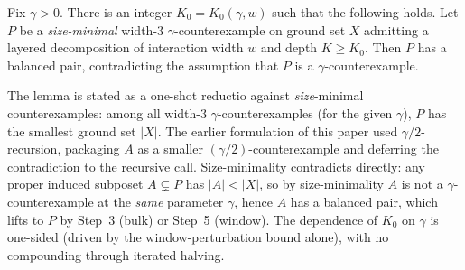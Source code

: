 \begin{lemma}\label{lem:layered-reduction}
Fix $\gamma > 0$. There is an integer $K_0 = K_0(\gamma, w)$ such
that the following holds. Let $P$ be a \emph{size-minimal} width-$3$
$\gamma$-counterexample on ground set $X$ admitting a layered
decomposition of interaction width $w$ and depth $K \ge K_0$. Then
$P$ has a balanced pair, contradicting the assumption that $P$ is a
$\gamma$-counterexample.
\end{lemma}

\begin{remark}\label{rem:size-minimal-framing}
The lemma is stated as a one-shot reductio against \emph{size}-minimal
counterexamples: among all width-$3$ $\gamma$-counterexamples (for
the given $\gamma$), $P$ has the smallest ground set $|X|$. The
earlier formulation of this paper used $\gamma/2$-recursion,
packaging $A$ as a smaller $(\gamma/2)$-counterexample and deferring
the contradiction to the recursive call. Size-minimality contradicts
directly: any proper induced subposet $A \subsetneq P$ has
$|A| < |X|$, so by size-minimality $A$ is not a
$\gamma$-counterexample at the \emph{same} parameter $\gamma$, hence
$A$ has a balanced pair, which lifts to $P$ by Step~3 (bulk) or
Step~5 (window). The dependence of $K_0$ on $\gamma$ is one-sided
(driven by the window-perturbation bound alone), with no compounding
through iterated halving.
\end{remark}

